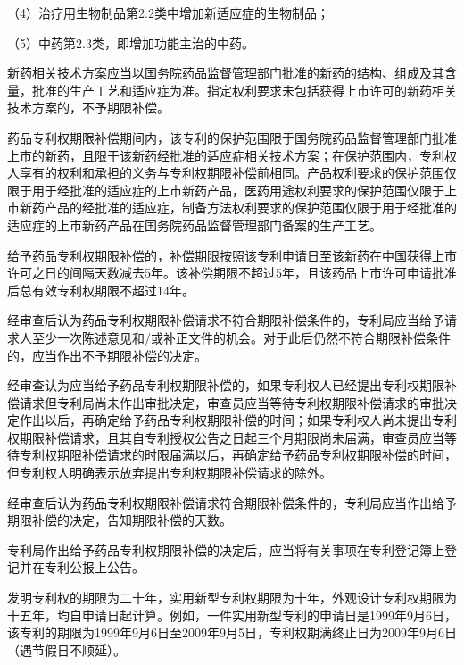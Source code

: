 {\setlength{\parindent}{17.1bp}（4）治疗用生物制品第2.2类中增加新适应症的生物制品；\par}

{\setlength{\parindent}{17.1bp}（5）中药第2.3类，即增加功能主治的中药。\par}

新药相关技术方案应当以国务院药品监督管理部门批准的新药的结构、组成及其含量，批准的生产工艺和适应症为准。指定权利要求未包括获得上市许可的新药相关技术方案的，不予期限补偿。

药品专利权期限补偿期间内，该专利的保护范围限于国务院药品监督管理部门批准上市的新药，且限于该新药经批准的适应症相关技术方案；在保护范围内，专利权人享有的权利和承担的义务与专利权期限补偿前相同。产品权利要求的保护范围仅限于用于经批准的适应症的上市新药产品，医药用途权利要求的保护范围仅限于上市新药产品的经批准的适应症，制备方法权利要求的保护范围仅限于用于经批准的适应症的上市新药产品在国务院药品监督管理部门备案的生产工艺。

给予药品专利权期限补偿的，补偿期限按照该专利申请日至该新药在中国获得上市许可之日的间隔天数减去5年。该补偿期限不超过5年，且该药品上市许可申请批准后总有效专利权期限不超过14年。

经审查后认为药品专利权期限补偿请求不符合期限补偿条件的，专利局应当给予请求人至少一次陈述意见和/或补正文件的机会。对于此后仍然不符合期限补偿条件的，应当作出不予期限补偿的决定。

经审查认为应当给予药品专利权期限补偿的，如果专利权人已经提出专利权期限补偿请求但专利局尚未作出审批决定，审查员应当等待专利权期限补偿请求的审批决定作出以后，再确定给予药品专利权期限补偿的时间；如果专利权人尚未提出专利权期限补偿请求，且其自专利授权公告之日起三个月期限尚未届满，审查员应当等待专利权期限补偿请求的时限届满以后，再确定给予药品专利权期限补偿的时间，但专利权人明确表示放弃提出专利权期限补偿请求的除外。

经审查后认为药品专利权期限补偿请求符合期限补偿条件的，专利局应当作出给予期限补偿的决定，告知期限补偿的天数。

专利局作出给予药品专利权期限补偿的决定后，应当将有关事项在专利登记簿上登记并在专利公报上公告。

发明专利权的期限为二十年，实用新型专利权期限为十年，外观设计专利权期限为十五年，均自申请日起计算。例如，一件实用新型专利的申请日是1999年9月6日，该专利的期限为1999年9月6日至2009年9月5日，专利权期满终止日为2009年9月6日（遇节假日不顺延）。

